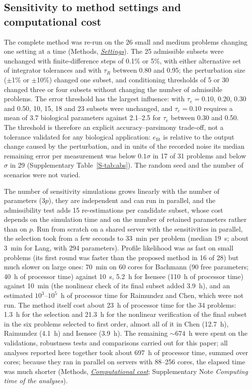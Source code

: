 \documentclass[pdflatex,sn-nature]{sn-jnl}
\theoremstyle{plain}
\newcommand{\mref}[2]{\hyperref[#1]{#2}}
\begin{document}
\subsection*{Sensitivity to method settings and computational cost}\label{sec:settings}

The complete method was re-run on the 26 small and medium problems changing one setting at a time (Methods, \mref{met:settings}{\emph{Settings}}). The 25 admissible subsets were unchanged with finite-difference steps of 0.1\% or 5\%, with either alternative set of integrator tolerances and with $\tau_R$ between 0.80 and 0.95; the perturbation size ($\pm$1\% or $\pm$10\%) changed one subset, and conditioning thresholds of 5 or 30 changed three or four subsets without changing the number of admissible problems. The error threshold has the largest influence: with $\tau_e=0.10$, 0.20, 0.30 and 0.50, 10, 15, 18 and 23 subsets were unchanged, and $\tau_e=0.10$ requires a mean of 3.7 biological parameters against 2.1--2.5 for $\tau_e$ between 0.30 and 0.50. The threshold is therefore an explicit accuracy--parsimony trade-off, not a tolerance validated for any biological application: $e_{\mathrm{fit}}$ is relative to the output change caused by the perturbation, and in units of the recorded noise its median remaining error per measurement was below $0.1\sigma$ in 17 of 31 problems and below $\sigma$ in 29 (Supplementary Table~\ref{S-tab:abs}). The random seed and the number of scenarios were not varied.

The number of sensitivity simulations grows linearly with the number of parameters ($3p$), they are independent and can run in parallel, and the admissibility test adds 15 re-estimations per candidate subset, whose cost depends on the simulation time and on the number of retained parameters rather than on $p$. Run from scratch on a shared server with the sensitivities in parallel, the selection took from a few seconds to 33~min per problem (median 19~s; about 3~min for Lang, with 294 parameters). Profile likelihood was as fast on small problems (its first round was faster than the proposed method in 16 of 28) but much slower on large ones: 70~min on 60 cores for Bachmann (90 free parameters; 40~h of processor time) against 10~s, 5.2~h for Isensee (110~h of processor time) against 10~min (the nonlinear check of its final subset added 3.9~h), and an estimated $10^3$--$10^5$~h of processor time for Raimundez and Chen, which were not run. The method itself cost about 23~h of processor time for the 34 problems: 1.3~h for the selection and 21.3~h for the nonlinear verification of the final subset in the six problems selected to first order, almost all of it in Chen (12.7~h), Raimundez (4.1~h) and Isensee (3.9~h). The remaining ${\sim}674$~h were spent on the validations, robustness tests and comparisons carried out for this paper; all analyses reported here together took about 697~h of processor time, summed over cores; because they ran in parallel on servers with 88--256 cores, the elapsed time was much shorter (Methods, \mref{met:cost}{\emph{Computational cost}}; Supplementary Note \textit{Computing time of the analyses}).
\end{document}
